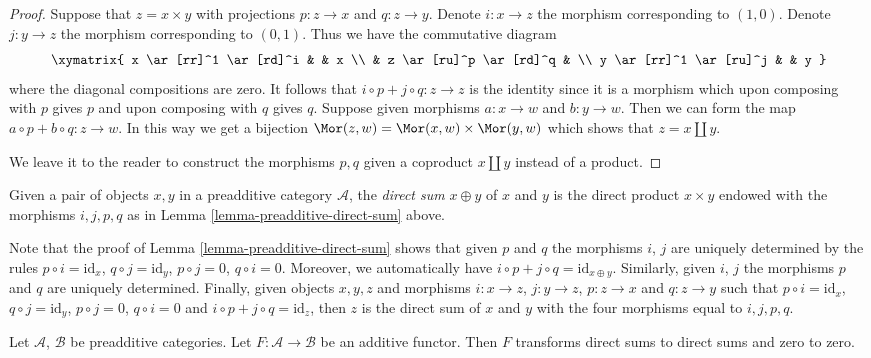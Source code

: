 \begin{proof}
Suppose that $z = x \times y$ with projections
$p : z \to x$ and $q : z \to y$. Denote $i : x \to z$
the morphism corresponding to $(1, 0)$. Denote $j : y \to z$
the morphism corresponding to $(0, 1)$. Thus we have the
commutative diagram
$$
\xymatrix{
x \ar[rr]^1 \ar[rd]^i & & x \\
& z \ar[ru]^p \ar[rd]^q & \\
y \ar[rr]^1 \ar[ru]^j & & y
}
$$
where the diagonal compositions are zero. It follows that
$i \circ p + j \circ q : z \to z$ is the identity since
it is a morphism which upon composing with $p$ gives $p$
and upon composing with $q$ gives $q$.
Suppose given morphisms $a : x \to w$ and $b : y \to w$.
Then we can form the map $a \circ p + b \circ q : z \to w$.
In this way we get a bijection $\Mor(z, w)
= \Mor(x, w) \times \Mor(y, w)$ which
shows that $z = x \amalg y$.

\medskip\noindent
We leave it to the reader to construct the morphisms
$p, q$ given a coproduct $x \amalg y$ instead of a
product.
\end{proof}

\begin{definition}
\label{definition-direct-sum}
Given a pair of objects $x, y$ in a preadditive category $\mathcal{A}$,
the {\it direct sum} $x \oplus y$ of $x$ and $y$ is the direct
product $x \times y$ endowed with the morphisms
$i, j, p, q$ as in Lemma \ref{lemma-preadditive-direct-sum} above.
\end{definition}

\begin{remark}
\label{remark-direct-sum}
Note that the proof of Lemma \ref{lemma-preadditive-direct-sum}
shows that given $p$ and $q$ the morphisms $i$, $j$ are uniquely
determined by the rules $p \circ i = \text{id}_x$,
$q \circ j = \text{id}_y$, $p \circ j = 0$, $q \circ i = 0$.
Moreover, we automatically have
$i \circ p + j \circ q = \text{id}_{x \oplus y}$.
Similarly, given $i$, $j$ the morphisms $p$ and $q$ are uniquely determined.
Finally, given objects $x, y, z$ and morphisms
$i : x \to z$, $j : y \to z$, $p : z \to x$ and
$q : z \to y$ such that $p \circ i = \text{id}_x$,
$q \circ j = \text{id}_y$, $p \circ j = 0$, $q \circ i = 0$
and $i \circ p + j \circ q = \text{id}_z$, then $z$
is the direct sum of $x$ and $y$ with the four morphisms
equal to $i, j, p, q$.
\end{remark}

\begin{lemma}
\label{lemma-additive-additive}
Let $\mathcal{A}$, $\mathcal{B}$ be preadditive categories.
Let $F : \mathcal{A} \to \mathcal{B}$ be an additive functor.
Then $F$ transforms direct sums to direct sums and zero to zero.
\end{lemma}

